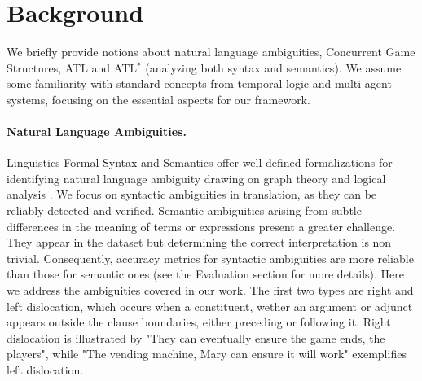 \section{Background}

We briefly provide notions about %
natural language ambiguities, Concurrent Game Structures, ATL and ATL$^\ast$ (analyzing both syntax and semantics). We assume some familiarity with standard concepts from temporal logic and multi-agent systems, focusing on the essential aspects for our framework.


\paragraph{Natural Language Ambiguities.}
Linguistics Formal Syntax and Semantics offer well defined formalizations for identifying natural language ambiguity drawing on graph theory and logical analysis \cite{chomsky1970remarks}. We focus on syntactic ambiguities in translation, as they can be reliably detected and verified. Semantic ambiguities arising from subtle differences in the meaning of terms or expressions present a greater challenge. They appear in the dataset but determining the correct interpretation is non trivial. Consequently, accuracy metrics for syntactic ambiguities are more reliable than those for semantic ones (see the Evaluation section for more details). Here we address the ambiguities covered in our work. The first two types are  right and left dislocation, which occurs when a constituent, wether an argument or adjunct appears outside the clause boundaries, either preceding or following it. Right dislocation is illustrated by "They can eventually ensure the game ends, the players", while "The vending machine, Mary can ensure it will work" exemplifies left dislocation. 
